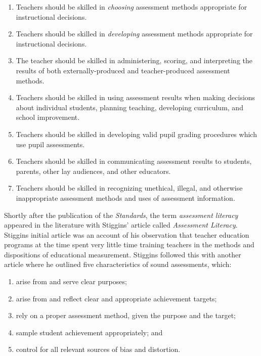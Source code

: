 \documentclass[
]{book}
\providecommand{\tightlist}{%
  \setlength{\itemsep}{0pt}\setlength{\parskip}{0pt}}
\begin{document}
\begin{enumerate}
\def\labelenumi{\arabic{enumi}.}
\tightlist
\item
  Teachers should be skilled in \emph{choosing} assessment methods appropriate for instructional decisions.
\item
  Teachers should be skilled in \emph{developing} assessment methods appropriate for instructional decisions.
\item
  The teacher should be skilled in administering, scoring, and interpreting the results of both externally-produced and teacher-produced assessment methods.
\item
  Teachers should be skilled in using assessment results when making decisions about individual students, planning teaching, developing curriculum, and school improvement.
\item
  Teachers should be skilled in developing valid pupil grading procedures which use pupil assessments.
\item
  Teachers should be skilled in communicating assessment results to students, parents, other lay audiences, and other educators.
\item
  Teachers should be skilled in recognizing unethical, illegal, and otherwise inappropriate assessment methods and uses of assessment information.
\end{enumerate}

Shortly after the publication of the \emph{Standards}, the term \emph{assessment literacy} appeared in the literature with Stiggins' \citeyearpar{stigginsAssessmentLiteracy1991} article called \emph{Assessment Literacy}. Stiggins initial article was an account of his observation that teacher education programs at the time spent very little time training teachers in the methods and dispositions of educational measurement. Stiggins followed this with another article \citep{stigginsAssessmentLiteracy21st1995} where he outlined five characteristics of sound assessments, which:

\begin{enumerate}
\def\labelenumi{\arabic{enumi}.}
\tightlist
\item
  arise from and serve clear purposes;
\item
  arise from and reflect clear and appropriate achievement targets;
\item
  rely on a proper assessment method, given the purpose and the target;
\item
  sample student achievement appropriately; and
\item
  control for all relevant sources of bias and distortion. \citeyearpar[p.~240]{stigginsAssessmentLiteracy21st1995}
\end{enumerate}
\end{document}
